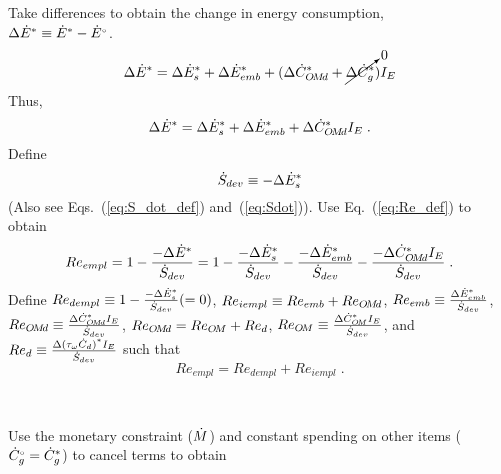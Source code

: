 \begin{landscape}
{Take differences to obtain the change in energy consumption, \\
$\Delta {\dot{E}}^* \equiv {\dot{E}}^* - {}{\dot{E}}^{\scriptscriptstyle \circ}$.
%
\begin{equation}
  \Delta {\dot{E}}^* = \Delta {\dot{E}}^*_s
                      + \Delta {\dot{E}}^*_{emb}
                      + (\Delta {\dot{C}}^*_{O\!M\!d}
                      + \cancelto{0}{\Delta {\dot{C}}^*_g}) I_E
\end{equation}
%
Thus, 
%
\begin{equation}
\Delta {\dot{E}}^* = \Delta {\dot{E}}^*_s + \Delta {\dot{E}}^*_{emb} + \Delta {\dot{C}}^*_{O\!M\!d} I_E \; .
\end{equation}
%
Define
%
\begin{equation} \label{eq:Sdot_def}
\dot{S}_{dev} \equiv -\Delta {\dot{E}}^*_s
\end{equation}
%
(Also see Eqs.~(\ref{eq:S_dot_def}) and~(\ref{eq:Sdot})). 
Use Eq.~(\ref{eq:Re_def}) to obtain
%
\begin{equation}
Re_{empl} = 1 - \frac{-\Delta {\dot{E}}^*}{\dot{S}_{dev}} 
          = 1 - \frac{-\Delta {\dot{E}}^*_s}{\dot{S}_{dev}} 
              - \frac{-\Delta {\dot{E}}^*_{emb}}{\dot{S}_{dev}}
              - \frac{-\Delta {\dot{C}}^*_{O\!M\!d} I_E}{\dot{S}_{dev}} \; .
\end{equation}
%
Define $Re_{dempl} \equiv 1 - \frac{-\Delta {\dot{E}}^*_s}{\dot{S}_{dev}} (= 0)$, 
$Re_{iempl} \equiv Re_{emb} + Re_{O\!M\!d}$, 
$Re_{emb} \equiv \frac{\Delta {\dot{E}}^*_{emb}}{\dot{S}_{dev}}$,
$Re_{O\!M\!d} \equiv \frac{\Delta {\dot{C}}^*_{O\!M\!d} I_E}{\dot{S}_{dev}}$, 
$Re_{O\!M\!d} = Re_{O\!M} + Re_d$,
$Re_{O\!M} \equiv \frac{\Delta {\dot{C}}^*_{O\!M} I_E}{\dot{S}_{dev}}$, and 
$Re_d \equiv \frac{\Delta {(\tau_\omega \dot{C}_d)}^* I_E}{\dot{S}_{dev}}$
such that
%
\begin{equation} \label{eq:Re_empl_def}
Re_{empl} = Re_{dempl} + Re_{iempl} \; .
\end{equation}
}
{
~
    
Use the monetary constraint ($\dot{M}$)
and constant spending on other items (${}{\dot{C}}^{\scriptscriptstyle \circ}_g = {\dot{C}}^*_g$) to cancel terms to obtain

}
\end{landscape}
